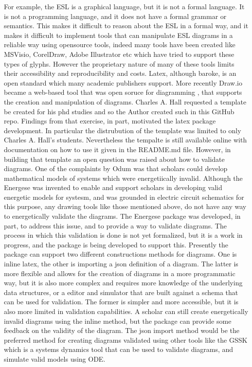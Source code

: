 For example, the ESL is a graphical language, but it is not a formal language. It is not a programming language, and it does not have a formal grammar or semantics. This makes it difficult to reason about the ESL in a formal way, and it makes it difficult to implement tools that can manipulate ESL diagrams in a reliable way using opensource tools, indeed many tools have been created like MSVisio, CorelDraw, Adobe Illustrator etc which have tried to support these types of glyphs. However the proprietary nature of many of these tools limits their accessibility and reproducibility and costs. Latex, although baroke, is an open standard which many academic publishers support. More recently Draw.io became a web-based tool that was open soruce for diagramming , that supports the creation and manipulation of diagrams. Charles A. Hall requested a template be created for his phd studies and so the Author created such in this GitHub repo. Findings from that exercise, in part,  motivated the latex package development. In particular the distrubution of the template was limited to only Charles A. Hall's students. Nevertheless the tempalte is still available online with documentation on how to use it given in the README.md file. However, in building that template an open question was raised about how to validate diagrams. One of the complaints by Odum was that scholars could develop mathematical models of systems which were energetiically invalid. Although the Energese was invented to enable and support scholars in developing valid energetic models for systesm, and was grounded in electric circuit schematics for this purpose, any drawing tools like those mentioned above, do not have any way to energetically validate the diagrams. The Energese package was developed, in part, to address this issue, and to provide a way to validate diagrams. The process in which this validation is done is not yet formalized, but it is a work in progress, and the package is being developed to support this. Presently the package can support two different constructions methods for diagrams. One is inline latex, the other is importing a json definition of a diagram. The latter is more flexible and allows for the creation of diagrams in a more programmatic way, but it is also more complex and requires more knowledge of the underlying data structures, or a editor and simulator that are built against a schema that can be used for validation. The former is simpler and more accessible, but it is also more limited in validation capabilities. A scholar can still create energetically invalid diagrams using the inline method, but the package can provide some feedback on the validity of the diagram. The json import method would be the preferred method for creating diagrams validated using other tools like the GSSK which is a systems dynamics tool that can be used to validate diagrams, and simulate valid models using ODE.

